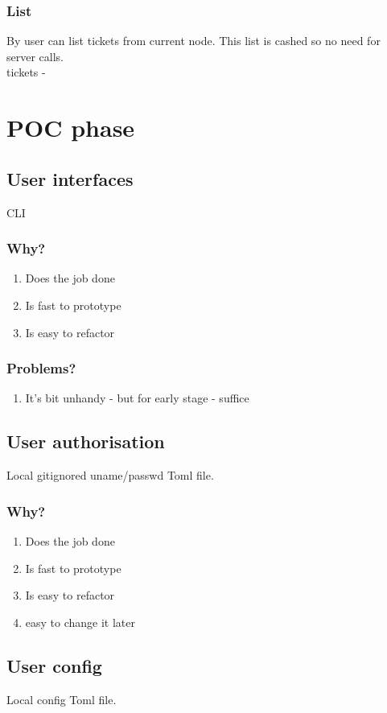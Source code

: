 \subsubsection{List}\label{GF:CRUD:LIST}
By  user can list tickets from current node. This list is cashed so no 
need for server calls.\\
tickets - 

\newpage
\section{POC phase}
\subsection{User interfaces}\label{UI:POC}
CLI
\subsubsection{Why?}
\begin{enumerate}
    \item Does the job done
    \item Is fast to prototype
    \item Is easy to refactor
\end{enumerate}
\subsubsection{Problems?}
\begin{enumerate}
    \item It's bit unhandy - but for early stage - suffice
\end{enumerate}

\subsection{User authorisation}\label{AUTH:POC}
Local gitignored uname/passwd Toml file.
\subsubsection{Why?}
\begin{enumerate}
    \item Does the job done
    \item Is fast to prototype
    \item Is easy to refactor
    \item easy to change it later
\end{enumerate}
\subsection{User config}\label{CONFIG:POC}
Local config Toml file.
